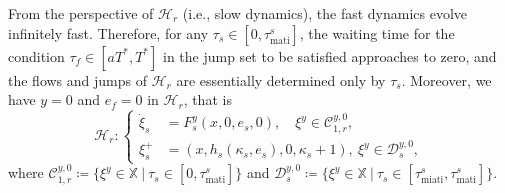 From the perspective of $\mathcal{H}_r$ (i.e., slow dynamics), the fast dynamics evolve infinitely fast. Therefore, for any $\tau_s \in [0, \tau_{\text{mati}}^s] $, the waiting time for the condition $\tau_f \in [aT^*, T^*]$ in the jump set to be satisfied approaches to zero, and the flows and jumps of $\mathcal{H}_r$ are essentially determined only by $\tau_s$. 
%
Moreover, we have $y=0$ and $e_f = 0$ in $\mathcal{H}_r$, that is 
%
\begin{equation}
    \mathcal{H}_{r}:\left\{
\begin{aligned}
    \dot \xi_s &= F_s^y(x,0,e_s, 0) , \quad \xi^y \in \mathcal{C}_{1,r}^{y,0}, \\
    \xi_s^+  &=   (x, h_s(\kappa_s, e_s), 0, \kappa_s + 1), \  \xi^y\in \mathcal{D}_s^{y,0},
\end{aligned}
    \right.
    \label{eqn: H_r}
\end{equation}
where $\mathcal{C}_{1,r}^{y,0} \coloneqq \{\xi^y \in  \mathbb{X} \ | \ \tau_s \in [0, \tau_{\text{mati}}^s]\}$ and $\mathcal{D}_s^{y,0}\coloneqq \{\xi^y \in  \mathbb{X} \ | \ \tau_s \in [\tau_{\text{miati}}^s, \tau_{\text{mati}}^s] \}$.












